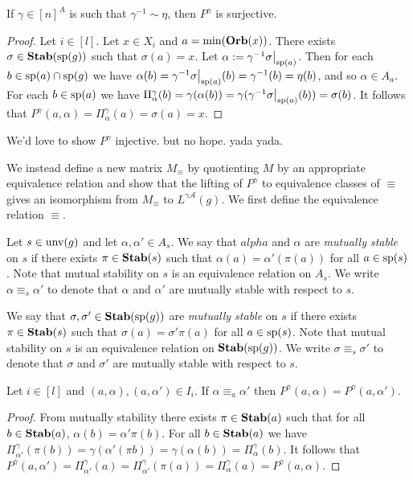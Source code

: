 \documentclass[../main/thesis.tex]{subfiles}
\begin{document}
\begin{lem} 
	If $\gamma \in [n]^{\underline{A}}$ is such that $\gamma^{-1} \sim \eta$, then
  $P^{\gamma}$ is surjective.
  \label{lem:M-to-L-surjective}
\end{lem}
\begin{proof}
  Let $i \in [l]$. Let $x \in X_i$ and $a = \min(\text{\textbf{Orb}}(x))$. There exists $\sigma
  \in \text{\textbf{Stab}} (\text{sp} (g))$ such that $\sigma (a) = x$. Let $\alpha := \gamma^{-1}
  \restr{\sigma}{\consp(a)}$. Then for each $b \in \text{sp}(a) \cap \text{sp}(g)$ we
  have $\alpha(b) = \gamma^{-1} \restr{\sigma}{\consp(a)} (b) = \gamma^{-1}(b) =
  \eta (b)$, and so $\alpha \in A_a$. For each $b \in \text{sp}(a)$ we have
  $\Pi^{\gamma}_\alpha(b) = \gamma (\alpha(b)) = \gamma(\gamma^{-1}
  \restr{\sigma}{\consp(a)}(b)) = \sigma (b)$. It follows that $P^{\gamma}(a,
  \alpha) = \Pi^{\gamma}_\alpha(a) = \sigma (a) = x$.
\end{proof}


We'd love to show $P^{\gamma}$ injective. but no hope. yada yada.

We instead define a new matrix $M_{\equiv}$ by quotienting $M$ by an appropriate
equivalence relation and show that the lifting of $P^{\gamma}$ to equivalence
classes of $\equiv$ gives an isomorphism from $M_\equiv$ to
$L^{\gamma\mathcal{A}}(g)$. We first define the equivalence relation $\equiv$.

\begin{definition}
  Let $s \in \text{unv}(g)$ and let $\alpha, \alpha' \in A_s$. We say that
  $alpha$ and $\alpha$ are \emph{mutually stable} on $s$ if there exists $\pi
  \in \text{\textbf{Stab}}(s)$ such that $\alpha (a) = \alpha' (\pi (a))$ for all $a \in
  \text{sp}(s)$. Note that mutual stability on $s$ is an equivalence relation on
  $A_s$. We write $\alpha \equiv_s \alpha'$ to denote that $\alpha$ and
  $\alpha'$ are mutually stable with respect to $s$.
  
  We say that $\sigma, \sigma' \in \text{\textbf{Stab}} (\text{sp} (g))$ are \emph{mutually stable} on $s$
  if there exists $\pi \in \text{\textbf{Stab}}(s)$ such that $\sigma (a) = \sigma' \pi (a)$
  for all $a \in \text{sp}(s)$. Note that mutual stability on $s$ is an equivalence
  relation on $\text{\textbf{Stab}} (\text{sp} (g))$. We write $\sigma \equiv_s \sigma'$ to denote that
  $\sigma$ and $\sigma'$ are mutually stable with respect to $s$.
\end{definition}

\begin{lem}
  Let $i \in [l]$ and $(a, \alpha), (a, \alpha') \in I_i$. If $\alpha \equiv_a
  \alpha'$ then $P^{\gamma}(a, \alpha) = P^{\gamma}(a, \alpha')$.
	\label{lem:quot-well-defined}
\end{lem}
\begin{proof}
  From mutually stability there exists $\pi \in \text{\textbf{Stab}}(a)$ such that for all $b
  \in \text{\textbf{Stab}}(a)$, $\alpha (b) = \alpha' \pi (b)$. For all $b \in \text{\textbf{Stab}}(a)$ we
  have $\Pi^{\gamma}_{\alpha'} (\pi (b)) = \gamma (\alpha' (\pi b)) = \gamma
  (\alpha (b)) = \Pi^{\gamma}_{\alpha}(b)$. It follows that $P^{\gamma}(a,
  \alpha') = \Pi^{\gamma}_{\alpha'} (a) = \Pi^{\gamma}_{\alpha'} (\pi (a)) =
  \Pi^{\gamma}_{\alpha}(a) = P^{\gamma}(a, \alpha)$.
\end{proof}
\end{document}
